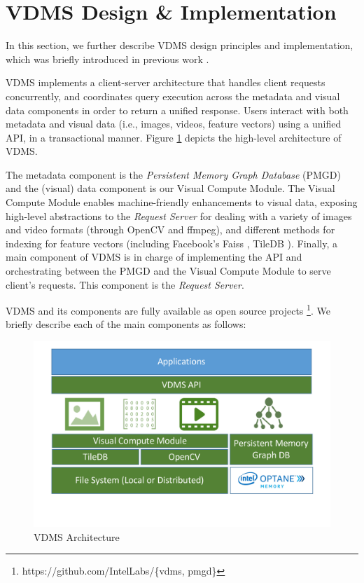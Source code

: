 \section{VDMS Design \& Implementation}
\label{arch}

In this section, we further describe VDMS design principles and implementation,
which was briefly introduced in previous work \cite{vdms-nips}.

VDMS implements a client-server architecture that handles client
requests concurrently, and coordinates query execution across
the metadata and visual data components in order to return a unified response.
Users interact with both metadata and visual data
(i.e., images, videos, feature vectors) using a unified API,
in a transactional manner.
Figure \ref{fig:arch} depicts the high-level architecture of VDMS.

The metadata component is the \textit{Persistent Memory Graph
Database} (PMGD) and the (visual) data component is our Visual Compute Module.
The Visual Compute Module enables machine-friendly enhancements to
visual data, exposing high-level abstractions to the \textit{Request Server}
for dealing with a variety of images and video formats (through OpenCV and ffmpeg),
and different methods for indexing for feature vectors
(including Facebook's Faiss \cite{faiss}, TileDB \cite{TileDB}).
Finally, a main component of VDMS is in charge of implementing the
API and orchestrating between the PMGD and the Visual Compute Module
to serve client's requests. This component is the \textit{Request Server}.

VDMS and its components are fully available as open source projects
\footnote{https://github.com/IntelLabs/\{vdms, pmgd\}}.
We briefly describe each of the main components as follows:

\begin{figure}
\centering
\includegraphics[width=1\columnwidth]{figures/vdms_arch.pdf}
\caption{VDMS Architecture}
\label{fig:arch}
\end{figure}

